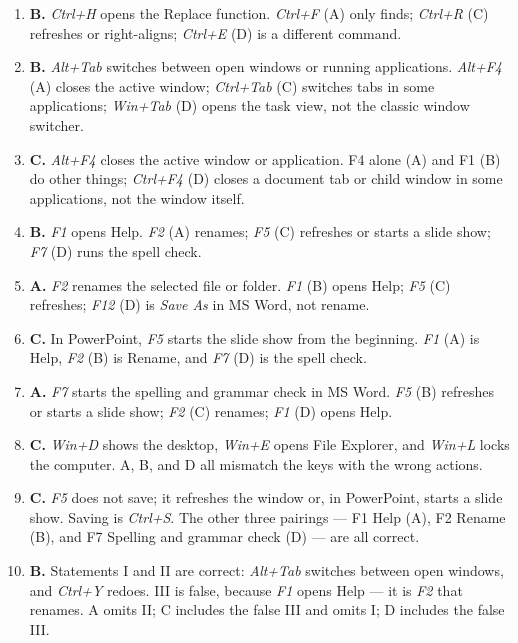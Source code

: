 \documentclass[11pt]{article}
\begin{document}
\begin{enumerate}[label=\textbf{Q\arabic*.}, leftmargin=*]
  opens Replace; \textit{Ctrl+N} (B) creates a new file; \textit{Ctrl+G} (D)
  is a different command.
\item \textbf{B.} \textit{Ctrl+H} opens the Replace function. \textit{Ctrl+F} (A)
  only finds; \textit{Ctrl+R} (C) refreshes or right-aligns; \textit{Ctrl+E} (D)
  is a different command.
\item \textbf{B.} \textit{Alt+Tab} switches between open windows or running
  applications. \textit{Alt+F4} (A) closes the active window; \textit{Ctrl+Tab}
  (C) switches tabs in some applications; \textit{Win+Tab} (D) opens the task
  view, not the classic window switcher.
\item \textbf{C.} \textit{Alt+F4} closes the active window or application. F4
  alone (A) and F1 (B) do other things; \textit{Ctrl+F4} (D) closes a document
  tab or child window in some applications, not the window itself.
\item \textbf{B.} \textit{F1} opens Help. \textit{F2} (A) renames; \textit{F5}
  (C) refreshes or starts a slide show; \textit{F7} (D) runs the spell check.
\item \textbf{A.} \textit{F2} renames the selected file or folder. \textit{F1}
  (B) opens Help; \textit{F5} (C) refreshes; \textit{F12} (D) is
  \textit{Save As} in MS Word, not rename.
\item \textbf{C.} In PowerPoint, \textit{F5} starts the slide show from the
  beginning. \textit{F1} (A) is Help, \textit{F2} (B) is Rename, and \textit{F7}
  (D) is the spell check.
\item \textbf{A.} \textit{F7} starts the spelling and grammar check in MS Word.
  \textit{F5} (B) refreshes or starts a slide show; \textit{F2} (C) renames;
  \textit{F1} (D) opens Help.
\item \textbf{C.} \textit{Win+D} shows the desktop, \textit{Win+E} opens File
  Explorer, and \textit{Win+L} locks the computer. A, B, and D all mismatch the
  keys with the wrong actions.
\item \textbf{C.} \textit{F5} does not save; it refreshes the window or, in
  PowerPoint, starts a slide show. Saving is \textit{Ctrl+S}. The other three
  pairings --- F1 Help (A), F2 Rename (B), and F7 Spelling and grammar check
  (D) --- are all correct.
\item \textbf{B.} Statements I and II are correct: \textit{Alt+Tab} switches
  between open windows, and \textit{Ctrl+Y} redoes. III is false, because
  \textit{F1} opens Help --- it is \textit{F2} that renames. A omits II; C
  includes the false III and omits I; D includes the false III.


\end{enumerate}
\end{document}
